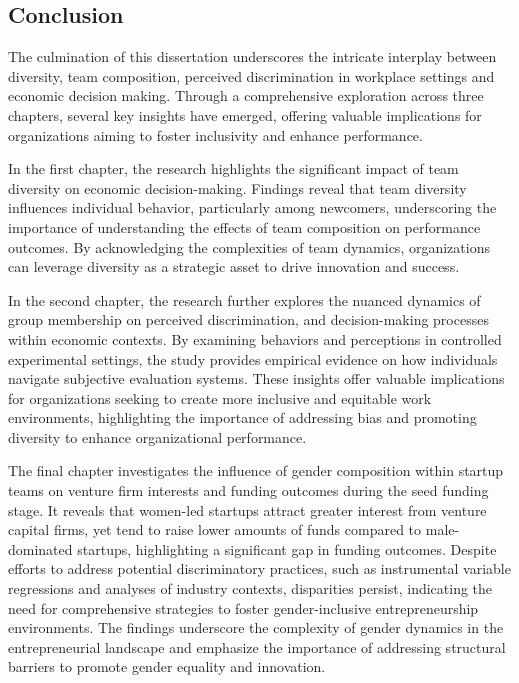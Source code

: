 
% 
\doublespacing

\begin{center}
\section*{Conclusion}\label{sec:Conclusion_all}
\end{center}

The culmination of this dissertation underscores the intricate interplay between diversity, team composition, perceived discrimination in workplace settings and economic decision making. Through a comprehensive exploration across three chapters, several key insights have emerged, offering valuable implications for organizations aiming to foster inclusivity and enhance performance.

In the first chapter, the research highlights the significant impact of team diversity on economic decision-making. Findings reveal that team diversity influences individual behavior, particularly among newcomers, underscoring the importance of understanding the effects of team composition on performance outcomes. By acknowledging the complexities of team dynamics, organizations can leverage diversity as a strategic asset to drive innovation and success.

In the second chapter, the research further explores the nuanced dynamics of group membership on perceived discrimination, and decision-making processes within economic contexts. By examining behaviors and perceptions in controlled experimental settings, the study provides empirical evidence on how individuals navigate subjective evaluation systems. These insights offer valuable implications for organizations seeking to create more inclusive and equitable work environments, highlighting the importance of addressing bias and promoting diversity to enhance organizational performance.

The final chapter investigates the influence of gender composition within startup teams on venture firm interests and funding outcomes during the seed funding stage. It reveals that women-led startups attract greater interest from venture capital firms, yet tend to raise lower amounts of funds compared to male-dominated startups, highlighting a significant gap in funding outcomes. Despite efforts to address potential discriminatory practices, such as instrumental variable regressions and analyses of industry contexts, disparities persist, indicating the need for comprehensive strategies to foster gender-inclusive entrepreneurship environments. The findings underscore the complexity of gender dynamics in the entrepreneurial landscape and emphasize the importance of addressing structural barriers to promote gender equality and innovation.

